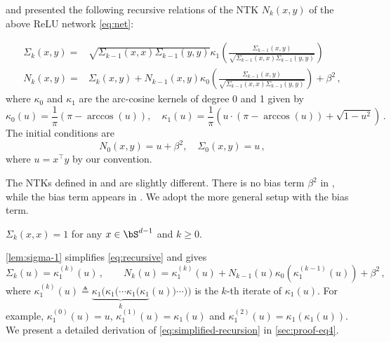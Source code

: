 \documentclass[11pt]{article}
\newcommand{\g}{\kappa_1}
\begin{document}
\citet{geifman2020similarity} and \citet{bietti2019inductive} presented the following recursive relations of the NTK $N_k(x,y)$ of the above ReLU network \eqref{eq:net}:

\begin{equation}\label{eq:recursive}
\begin{split}
    \Sigma_k(x,y) ={}& \sqrt{\Sigma_{k-1}(x,x)\Sigma_{k-1}(y,y)}\kappa_1\left(
    \frac{\Sigma_{k-1}(x,y)}{\sqrt{\Sigma_{k-1}(x,x)\Sigma_{k-1}(y,y)}}\right)\\
    N_k(x,y) ={}& \Sigma_k(x,y) + N_{k-1}(x,y)\kappa_0\left(\frac{\Sigma_{k-1}(x,y)}{\sqrt{\Sigma_{k-1}(x,x)\Sigma_{k-1}(y,y)}}\right) + \beta^2\,,
\end{split}
\end{equation}
 where $\kappa_0$ and $\g$ are the arc-cosine kernels of degree 0 and 1 \citep{cho2009kernel} given by \[
\kappa_0(u) = \frac{1}{\pi}(\pi-\arccos(u)),\quad \kappa_1(u) = \frac{1}{\pi}\left( u\cdot (\pi-\arccos(u)) + \sqrt{1-u^2} \right)\,.
\] 
The initial conditions are \begin{equation}\label{eq:init-cond}
    N_0(x,y) = u + \beta^2,\quad \Sigma_0(x,y) = u\,,
\end{equation}
where $u=x^\top y$ by our convention. 

The NTKs defined in \citep{bietti2019inductive} and \citep{geifman2020similarity} are slightly different. There is no bias term $\beta^2$ in \citep{bietti2019inductive}, while the bias term appears in \citep{geifman2020similarity}. We adopt the more general setup with the bias term. 

\begin{lemma}\label{lem:sigma-1}
$\Sigma_k(x,x) = 1$ for any $x\in \bS^{d-1}$ and $k\ge 0$.
\end{lemma}

\cref{lem:sigma-1} simplifies \eqref{eq:recursive} and gives 
\begin{equation}\label{eq:simplified-recursion}
\Sigma_k(u) ={} \g^{(k)}(u)\,, \qquad
N_k(u) ={} \g^{(k)}(u) + N_{k-1}(u)\kappa_0(\g^{(k-1)}(u)) + \beta^2\,,
\end{equation}
where $\g^{(k)}(u)\triangleq  \underbrace{\g( \g ( \cdots \g( \g}_{k}(u))\cdots ))$ is the $k$-th iterate of $\g(u)$. For example, $\kappa_1^{(0)}(u)=u$, $\kappa_1^{(1)}(u)=\kappa_1(u)$ and $\kappa_1^{(2)}(u) = \kappa_1(\kappa_1(u))$. We present a detailed derivation of \eqref{eq:simplified-recursion} in \cref{sec:proof-eq4}. 
\end{document}
